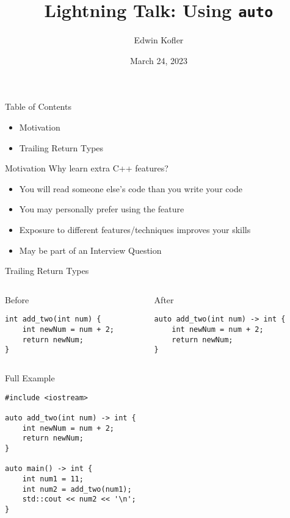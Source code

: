 \documentclass[t]{beamer}
\title{Lightning Talk: Using \texttt{auto}}
\author{Edwin Kofler}
\institute{El Camino College Computer Science Club}
\date{March 24, 2023}
\begin{document}
\frame{\titlepage}


\begin{frame}{Table of Contents}
	\begin{itemize}
		\item Motivation
		\item Trailing Return Types
	\end{itemize}

\end{frame}


\begin{frame}{Motivation}
	Why learn extra C++ features?

	\smallskip
	\begin{itemize}
		\item You will read someone else's code than you write your code
		\item You may personally prefer using the feature
		\item Exposure to different features/techniques improves your skills
		\item May be part of an Interview Question
	\end{itemize}

\end{frame}


\begin{frame}[fragile]{Trailing Return Types}
	\begin{columns}[]
		\begin{column}{.44\textwidth}
			{\large Before}
			\begin{verbatim}
int add_two(int num) {
	int newNum = num + 2;
	return newNum;
}
			\end{verbatim}
		\end{column}
		\pause
		\begin{column}{.5\textwidth}
			{\large After}
			\begin{verbatim}
auto add_two(int num) -> int {
	int newNum = num + 2;
	return newNum;
}
			\end{verbatim}
		\end{column}
	\end{columns}
\end{frame}


\begin{frame}[fragile]{Full Example}
	\medbreak
	\begin{verbatim}
#include <iostream>

auto add_two(int num) -> int {
	int newNum = num + 2;
	return newNum;
}

auto main() -> int {
	int num1 = 11;
	int num2 = add_two(num1);
	std::cout << num2 << '\n';
}
\end{verbatim}
\end{frame}
\end{document}
